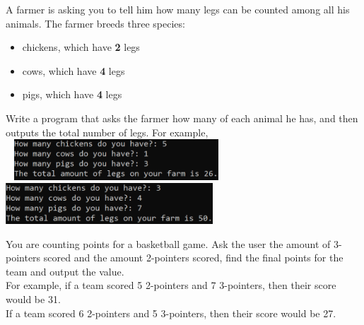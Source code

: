 


	\item
		A farmer is asking you to tell him how many legs can be counted among all his animals. 
		The farmer breeds three species:
		\begin{itemize}
			\item chickens, which have \textbf{2} legs
			\item cows, which have \textbf{4} legs
			\item pigs, which have \textbf{4} legs
		\end{itemize}
		Write a program that asks the farmer how many of each animal he has, and then outputs the
		total number of legs.  		
		For example, \\ \ \hfill
		\includegraphics[height = 0.6in]{./imgs/animalLegs_ex1.PNG} \hfill
		\includegraphics[height = 0.6in]{./imgs/animalLegs_ex2.PNG} \hfill \


	\item 
		You are counting points for a basketball game. Ask the user the amount of 3-pointers scored 
		and the amount 2-pointers scored, find the final points for the team and output the value.\\
		For example, if a team scored 5 2-pointers and 7 3-pointers, then their score would be 31.\\
		If a team scored 6 2-pointers and 5 3-pointers, then their score would be 27.




